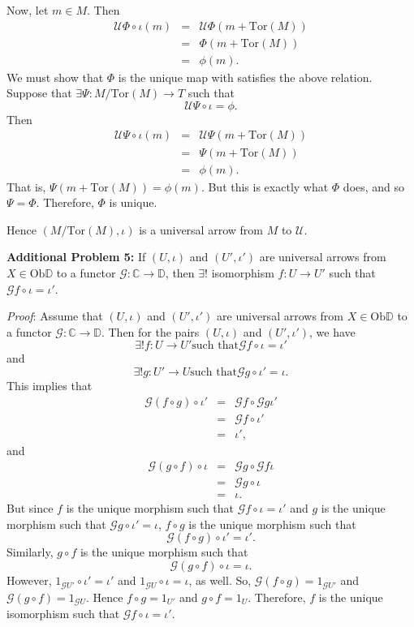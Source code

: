 \documentclass{article}
\newcommand{\C}{\mathbb{C}}
\newcommand{\D}{\mathbb{D}}
\newcommand{\Tor}{\textrm{Tor}}
\newcommand{\Ob}{\textrm{Ob}}
\begin{document}
\begin{flushleft}
 \medskip
 
 Now, let $m \in M$.  Then
  \begin{eqnarray*}
 \mathcal{U}\Phi\circ\iota(m)&=& \mathcal{U}\Phi(m+\Tor(M))\\
 &=&\Phi(m+\Tor(M))\\
 &=&\phi(m).
 \end{eqnarray*}
 We must show that $\Phi$ is the unique map with satisfies the above relation.  Suppose that $\exists \Psi:M/\Tor(M)\rightarrow T$ such that
 $$\mathcal{U}\Psi\circ\iota=\phi.$$
 Then
 \begin{eqnarray*}
 \mathcal{U}\Psi\circ\iota(m)&=& \mathcal{U}\Psi(m+\Tor(M))\\
 &=&\Psi(m+\Tor(M))\\
 &=&\phi(m).
 \end{eqnarray*}
 That is, $\Psi(m+\Tor(M))=\phi(m)$.  But this is exactly what $\Phi$ does, and so $\Psi=\Phi$.  Therefore, $\Phi$ is unique.
 
 \medskip
 
 Hence $(M/\Tor(M),\iota)$ is a universal arrow from $M$ to $\mathcal{U}$.
 
 \bigskip
 
 \textbf{Additional Problem 5:} If $(U,\iota)$ and $(U',\iota')$ are universal arrows from $X \in \Ob\D$ to a functor $\mathcal{G}:\C\rightarrow\D$, then $\exists!$ isomorphism $f:U\rightarrow U'$ such that $\mathcal{G}f\circ\iota=\iota'$.
 
 \medskip
 
 \textit{Proof}: Assume that  $(U,\iota)$ and $(U',\iota')$ are universal arrows from $X \in \Ob\D$ to a functor $\mathcal{G}:\C\rightarrow\D$.  Then for the pairs  $(U,\iota)$ and $(U',\iota')$, we have
 $$\exists! f:U\rightarrow U' \textrm{such that} \mathcal{G}f\circ\iota=\iota'$$
 and
 $$\exists! g:U'\rightarrow U \textrm{such that} \mathcal{G}g\circ\iota'=\iota.$$
 This implies that
 \begin{eqnarray*}
 \mathcal{G}(f\circ g)\circ\iota'&=& \mathcal{G}f\circ\mathcal{G}g\iota'\\
 &=&\mathcal{G}f\circ\iota'\\
 &=&\iota',
 \end{eqnarray*}
 and
 \begin{eqnarray*}
 \mathcal{G}(g\circ f)\circ\iota&=& \mathcal{G}g\circ\mathcal{G}f\iota\\
 &=&\mathcal{G}g\circ\iota\\
 &=&\iota.
 \end{eqnarray*}
 But since $f$ is the unique morphism such that $\mathcal{G}f\circ\iota=\iota'$ and $g$ is the unique morphism such that $\mathcal{G}g\circ\iota'=\iota$, $f\circ g$ is the unique morphism such that
 $$\mathcal{G}(f\circ g)\circ\iota'=\iota'.$$
 Similarly, $g\circ f$ is the unique morphism such that
 $$\mathcal{G}(g\circ f)\circ\iota=\iota.$$
However, $1_{\mathcal{G}U'}\circ\iota'=\iota'$ and $1_{\mathcal{G}U}\circ\iota=\iota$, as well.  So, $\mathcal{G}(f\circ g)=1_{\mathcal{G}U'}$ and $\mathcal{G}(g\circ f)=1_{\mathcal{G}U}$.  Hence $f\circ g=1_{U'}$ and $g\circ f=1_{U}$.  Therefore, $f$ is the unique isomorphism such that
$\mathcal{G}f\circ \iota=\iota'$.


\end{flushleft}
\end{document}
